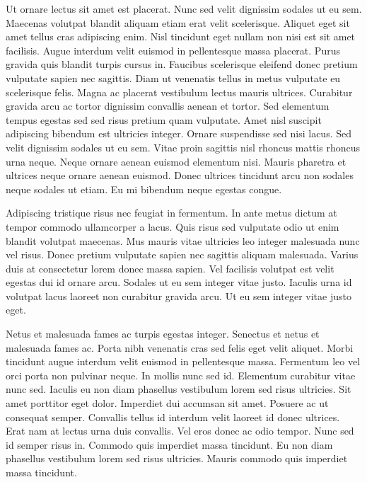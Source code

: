 \documentclass[11pt,a4paper]{article}
\begin{document}
Ut ornare lectus sit amet est placerat. Nunc sed velit dignissim sodales ut eu sem. Maecenas volutpat blandit aliquam etiam erat velit scelerisque. Aliquet eget sit amet tellus cras adipiscing enim. Nisl tincidunt eget nullam non nisi est sit amet facilisis. Augue interdum velit euismod in pellentesque massa placerat. Purus gravida quis blandit turpis cursus in. Faucibus scelerisque eleifend donec pretium vulputate sapien nec sagittis. Diam ut venenatis tellus in metus vulputate eu scelerisque felis. Magna ac placerat vestibulum lectus mauris ultrices. Curabitur gravida arcu ac tortor dignissim convallis aenean et tortor. Sed elementum tempus egestas sed sed risus pretium quam vulputate. Amet nisl suscipit adipiscing bibendum est ultricies integer. Ornare suspendisse sed nisi lacus. Sed velit dignissim sodales ut eu sem. Vitae proin sagittis nisl rhoncus mattis rhoncus urna neque. Neque ornare aenean euismod elementum nisi. Mauris pharetra et ultrices neque ornare aenean euismod. Donec ultrices tincidunt arcu non sodales neque sodales ut etiam. Eu mi bibendum neque egestas congue.

Adipiscing tristique risus nec feugiat in fermentum. In ante metus dictum at tempor commodo ullamcorper a lacus. Quis risus sed vulputate odio ut enim blandit volutpat maecenas. Mus mauris vitae ultricies leo integer malesuada nunc vel risus. Donec pretium vulputate sapien nec sagittis aliquam malesuada. Varius duis at consectetur lorem donec massa sapien. Vel facilisis volutpat est velit egestas dui id ornare arcu. Sodales ut eu sem integer vitae justo. Iaculis urna id volutpat lacus laoreet non curabitur gravida arcu. Ut eu sem integer vitae justo eget.

Netus et malesuada fames ac turpis egestas integer. Senectus et netus et malesuada fames ac. Porta nibh venenatis cras sed felis eget velit aliquet. Morbi tincidunt augue interdum velit euismod in pellentesque massa. Fermentum leo vel orci porta non pulvinar neque. In mollis nunc sed id. Elementum curabitur vitae nunc sed. Iaculis eu non diam phasellus vestibulum lorem sed risus ultricies. Sit amet porttitor eget dolor. Imperdiet dui accumsan sit amet. Posuere ac ut consequat semper. Convallis tellus id interdum velit laoreet id donec ultrices. Erat nam at lectus urna duis convallis. Vel eros donec ac odio tempor. Nunc sed id semper risus in. Commodo quis imperdiet massa tincidunt. Eu non diam phasellus vestibulum lorem sed risus ultricies. Mauris commodo quis imperdiet massa tincidunt.
\end{document}
